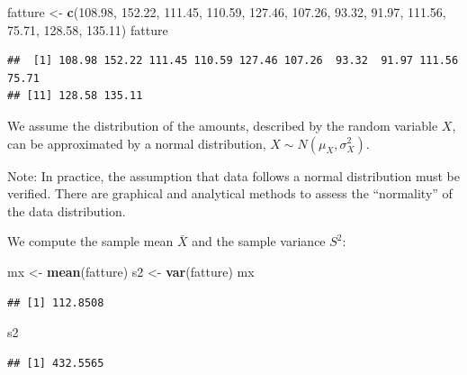 \documentclass[
]{article}
\newenvironment{Shaded}{\begin{snugshade}}{\end{snugshade}}
\newcommand{\FloatTok}[1]{\textcolor[rgb]{0.00,0.00,0.81}{#1}}
\newcommand{\FunctionTok}[1]{\textcolor[rgb]{0.13,0.29,0.53}{\textbf{#1}}}
\newcommand{\NormalTok}[1]{#1}
\newcommand{\OtherTok}[1]{\textcolor[rgb]{0.56,0.35,0.01}{#1}}
\begin{document}
\begin{Shaded}
\begin{Highlighting}[]
\NormalTok{fatture }\OtherTok{\textless{}{-}} \FunctionTok{c}\NormalTok{(}\FloatTok{108.98}\NormalTok{, }\FloatTok{152.22}\NormalTok{, }\FloatTok{111.45}\NormalTok{, }\FloatTok{110.59}\NormalTok{, }\FloatTok{127.46}\NormalTok{, }\FloatTok{107.26}\NormalTok{, }\FloatTok{93.32}\NormalTok{, }
             \FloatTok{91.97}\NormalTok{, }\FloatTok{111.56}\NormalTok{, }\FloatTok{75.71}\NormalTok{, }\FloatTok{128.58}\NormalTok{, }\FloatTok{135.11}\NormalTok{)}
\NormalTok{fatture}
\end{Highlighting}
\end{Shaded}

\begin{verbatim}
##  [1] 108.98 152.22 111.45 110.59 127.46 107.26  93.32  91.97 111.56  75.71
## [11] 128.58 135.11
\end{verbatim}

We assume the distribution of the amounts, described by the random
variable \(X\), can be approximated by a normal distribution,
\(X \sim N(\mu_X, \sigma^2_X)\).

Note: In practice, the assumption that data follows a normal
distribution must be verified. There are graphical and analytical
methods to assess the ``normality'' of the data distribution.

We compute the sample mean \(\bar{X}\) and the sample variance \(S^2\):

\begin{Shaded}
\begin{Highlighting}[]
\NormalTok{mx }\OtherTok{\textless{}{-}} \FunctionTok{mean}\NormalTok{(fatture)}
\NormalTok{s2 }\OtherTok{\textless{}{-}} \FunctionTok{var}\NormalTok{(fatture)}
\NormalTok{mx}
\end{Highlighting}
\end{Shaded}

\begin{verbatim}
## [1] 112.8508
\end{verbatim}

\begin{Shaded}
\begin{Highlighting}[]
\NormalTok{s2}
\end{Highlighting}
\end{Shaded}

\begin{verbatim}
## [1] 432.5565
\end{verbatim}
\end{document}
